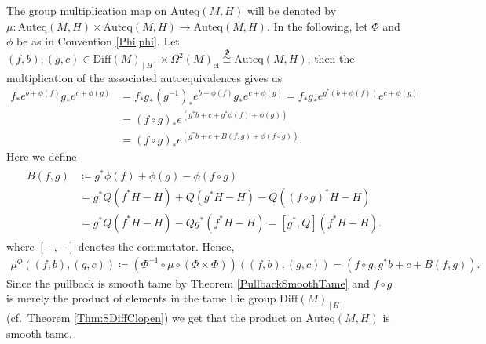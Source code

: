 \documentclass[12pt,a4paper]{article}
\theoremstyle{plain}
\theoremstyle{definition}
\newcommand{\Forms}[1]{\Omega^{#1}(M)}
\newcommand{\SDiff}{\mathrm{Diff}(M)_{[H]}}
\newcommand{\Auteq}{\mathrm{Auteq}(M,H)}
\begin{document}
The group multiplication map on $\Auteq$ will be denoted by
$\mu:\Auteq \times \Auteq \to \Auteq$. In the following, let $\Phi$ and $\phi$ be as in Convention \ref{Phi,phi}. Let $(f,b),(g,c)\in \SDiff\times \Forms{2}_{\mathrm{cl}}\stackrel{\Phi}{\cong}\Auteq$, then the multiplication of the associated autoequivalences gives us
\begin{align*}
    f_*e^{b+\phi(f)}g_*e^{c+\phi(g)}&=f_*g_*(g^{-1})_*e^{b+\phi(f)}g_*e^{c+\phi(g)}
    =f_*g_*e^{g^*(b+\phi(f))}e^{c+\phi(g)}\\
    &=(f\circ g)_*e^{(g^*b+c+g^*\phi(f)+\phi(g))}\\
    &=(f\circ g)_*e^{(g^*b+c+B(f,g)+\phi(f\circ g))}.
\end{align*}
Here we define
\begin{align}
\label{B(f,g)}
\begin{split}
    B(f,g)&\coloneqq g^*\phi(f)+\phi(g)-\phi(f\circ g)\\
    &= g^*Q(f^*H-H)+Q(g^*H-H)-Q((f\circ g)^*H-H)\\
    &=g^*Q(f^*H-H)-Qg^*(f^*H-H)=[g^*,Q](f^*H-H).
\end{split}
\end{align}
where $[-,-]$ denotes the commutator.
Hence, 
\begin{align}
\label{Prod}
    \mu^\Phi((f,b),(g,c))\coloneqq(\Phi^{-1}\circ \mu \circ (\Phi\times\Phi))((f,b),(g,c))=(f\circ g, g^*b+c+B(f,g)).
\end{align}
Since the pullback is smooth tame by Theorem \ref{PullbackSmoothTame} and $f\circ g$ is merely the product of elements in the tame Lie group $\SDiff$ (cf.~Theorem \ref{Thm:SDiffClopen}) we get that the product on $\Auteq$ is smooth tame. 
\end{document}
